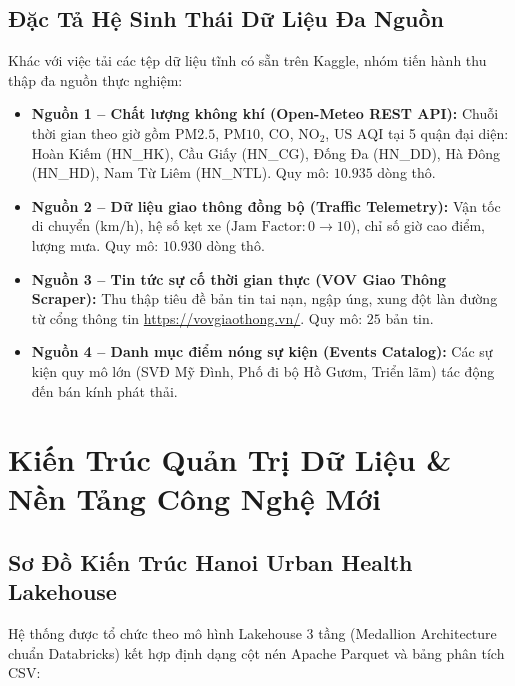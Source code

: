 \documentclass[11pt,a4paper]{article}
\begin{document}
\subsection{Đặc Tả Hệ Sinh Thái Dữ Liệu Đa Nguồn}
Khác với việc tải các tệp dữ liệu tĩnh có sẵn trên Kaggle, nhóm tiến hành thu thập đa nguồn thực nghiệm:
\begin{itemize}
    \item \textbf{Nguồn 1 -- Chất lượng không khí (Open-Meteo REST API):} Chuỗi thời gian theo giờ gồm $\text{PM2.5}$, $\text{PM10}$, $\text{CO}$, $\text{NO}_2$, $\text{US AQI}$ tại 5 quận đại diện: Hoàn Kiếm (HN\_HK), Cầu Giấy (HN\_CG), Đống Đa (HN\_DD), Hà Đông (HN\_HD), Nam Từ Liêm (HN\_NTL). Quy mô: $10.935$ dòng thô.
    \item \textbf{Nguồn 2 -- Dữ liệu giao thông đồng bộ (Traffic Telemetry):} Vận tốc di chuyển ($\text{km/h}$), hệ số kẹt xe ($\text{Jam Factor}: 0 \to 10$), chỉ số giờ cao điểm, lượng mưa. Quy mô: $10.930$ dòng thô.
    \item \textbf{Nguồn 3 -- Tin tức sự cố thời gian thực (VOV Giao Thông Scraper):} Thu thập tiêu đề bản tin tai nạn, ngập úng, xung đột làn đường từ cổng thông tin \url{https://vovgiaothong.vn/}. Quy mô: $25$ bản tin.
    \item \textbf{Nguồn 4 -- Danh mục điểm nóng sự kiện (Events Catalog):} Các sự kiện quy mô lớn (SVĐ Mỹ Đình, Phố đi bộ Hồ Gươm, Triển lãm) tác động đến bán kính phát thải.
\end{itemize}

\section{Kiến Trúc Quản Trị Dữ Liệu \& Nền Tảng Công Nghệ Mới}

\subsection{Sơ Đồ Kiến Trúc Hanoi Urban Health Lakehouse}
Hệ thống được tổ chức theo mô hình Lakehouse 3 tầng (Medallion Architecture chuẩn Databricks) kết hợp định dạng cột nén Apache Parquet và bảng phân tích CSV:
\end{document}
